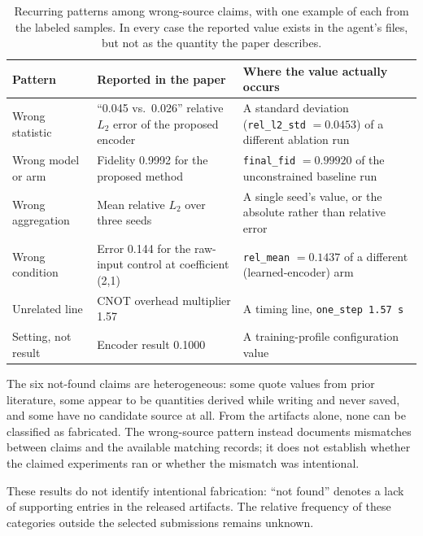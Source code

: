 \documentclass[preprint,12pt,authoryear]{elsarticle}
\begin{document}
\begin{table}[t]
\centering
\caption{Recurring patterns among wrong-source claims, with one example of each from the labeled samples. In every case the reported value exists in the agent's files, but not as the quantity the paper describes.}
\label{tab:patterns}
\footnotesize
\begin{tabular}{@{}>{\raggedright\arraybackslash}p{2.4cm}>{\raggedright\arraybackslash}p{4.6cm}>{\raggedright\arraybackslash}p{5.4cm}@{}}
\toprule
Pattern & Reported in the paper & Where the value actually occurs\\
\midrule
Wrong statistic & ``0.045 vs.\ 0.026'' relative $L_2$ error of the proposed encoder & A standard deviation (\texttt{rel\_l2\_std} $=0.0453$) of a different ablation run\\
Wrong model or arm & Fidelity 0.9992 for the proposed method & \texttt{final\_fid} $=0.99920$ of the unconstrained baseline run\\
Wrong aggregation & Mean relative $L_2$ over three seeds & A single seed's value, or the absolute rather than relative error\\
Wrong condition & Error 0.144 for the raw-input control at coefficient (2,1) & \texttt{rel\_mean} $=0.1437$ of a different (learned-encoder) arm\\
Unrelated line & CNOT overhead multiplier 1.57 & A timing line, \texttt{one\_step 1.57 s}\\
Setting, not result & Encoder result 0.1000 & A training-profile configuration value\\
\bottomrule
\end{tabular}
\end{table}

The six not-found claims are heterogeneous: some quote values from prior literature, some appear to be quantities derived while writing and never saved, and some have no candidate source at all. From the artifacts alone, none can be classified as fabricated. The wrong-source pattern instead documents mismatches between claims and the available matching records; it does not establish whether the claimed experiments ran or whether the mismatch was intentional.

These results do not identify intentional fabrication: ``not found'' denotes a lack of supporting entries in the released artifacts. The relative frequency of these categories outside the selected submissions remains unknown.
\end{document}
